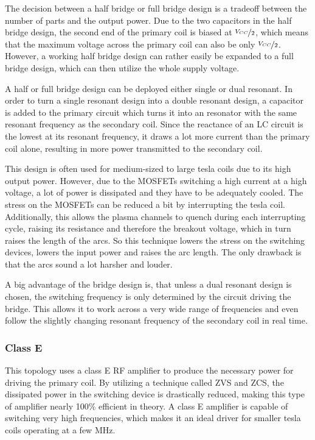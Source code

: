 The decision between a half bridge or full bridge design is a tradeoff between the number of parts and the output power. Due to the two capacitors in the half bridge design, the second end of the primary coil is biased at  \(\nicefrac{V_{CC}}{2}\), which means that the maximum voltage across the primary coil can also be only \(\nicefrac{V_{CC}}{2}\). However, a working half bridge design can rather easily be expanded to a full bridge design, which can then utilize the whole supply voltage.

A half or full bridge design can be deployed either single or dual resonant. In order to turn a single resonant design into a double resonant design, a capacitor is added to the primary circuit which turns it into an resonator with the same resonant frequency as the secondary coil. Since the reactance of an LC circuit is the lowest at its resonant frequency, it draws a lot more current than the primary coil alone, resulting in more power transmitted to the secondary coil.

This design is often used for medium-sized to large tesla coils due to its high output power. However, due to the MOSFETs switching a high current at a high voltage, a lot of power is dissipated and they have to be adequately cooled. The stress on the MOSFETs can be reduced a bit by interrupting the tesla coil. Additionally, this allows the plasma channels to quench during each interrupting cycle, raising its resistance and therefore the breakout voltage, which in turn raises the length of the arcs. So this technique lowers the stress on the switching devices, lowers the input power and raises the arc length. The only drawback is that the arcs sound a lot harsher and louder.

A big advantage of the bridge design is, that unless a dual resonant design is chosen, the switching frequency is only determined by the circuit driving the bridge. This allows it to work across a very wide range of frequencies and even follow the slightly changing resonant frequency of the secondary coil in real time.

\subsubsection{Class E}

This topology uses a class E RF amplifier to produce the necessary power for driving the primary coil. By utilizing a technique called ZVS and ZCS, the dissipated power in the switching device is drastically reduced, making this type of amplifier nearly 100\% efficient in theory. A class E amplifier is capable of switching very high frequencies, which makes it an ideal driver for smaller tesla coils operating at a few MHz.

